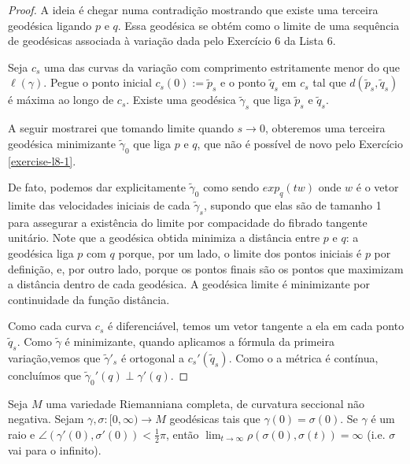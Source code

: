 \begin{proof}
A ideia é chegar numa contradição mostrando que existe uma terceira geodésica
ligando $p$ e $q$. Essa geodésica se obtém como o limite de uma sequência de
geodésicas associada à variação dada pelo Exercício 6 da Lista 6.

Seja $c_s$ uma das curvas da variação com comprimento estritamente
menor do que $\ell(\gamma)$. Pegue o ponto inicial $c_s(0):=\tilde{p}_s$ e o 
ponto $\tilde{q}_s$ em $c_s$ tal que $d(\tilde{p}_s,\tilde{q}_s)$ é máxima ao 
longo de $c_s$. Existe uma geodésica $\tilde{\gamma}_s$ que liga 
$\tilde{p}_s$ e $\tilde{q}_s$.

A seguir mostrarei que tomando limite quando $s \to 0$, obteremos uma terceira
geodésica minimizante $\tilde{\gamma}_0$ que liga $p$ e $q$, que não é possível
de novo pelo Exercício \ref{exercise-l8-1}.

De fato, podemos dar explicitamente $\tilde{\gamma}_0$ como sendo $exp_q(tw)$
onde $w$ é o vetor limite das velocidades iniciais de cada $\tilde{\gamma}_s$,
supondo que elas são de tamanho 1 para assegurar a existência do limite por
compacidade do fibrado tangente unitário. Note que a geodésica obtida minimiza a
distância entre $p$ e $q$: a geodésica liga $p$ com  $q$ porque, por um lado, o
limite dos pontos iniciais é $p$ por definição, e, por outro lado, porque os
pontos finais são os pontos que maximizam a distância dentro de cada geodésica.
A geodésica limite é minimizante por continuidade da função distância.

Como cada curva $c_s$ é diferenciável, temos um vetor tangente a ela em cada
ponto $\tilde{q}_s$. Como $\tilde{\gamma}$ é minimizante, quando aplicamos a
fórmula da primeira variação,vemos que $\tilde{\gamma}'_s$ é ortogonal a
$c_s'(\tilde{q}_s)$. Como o a métrica é contínua, concluímos que
$\tilde{\gamma}_0'(q) \perp \gamma'(q)$.
\end{proof}

\begin{exercise}
\label{exercise-l8-11}
Seja $M$ uma variedade Riemanniana completa, de curvatura seccional não
negativa. Sejam $\gamma,\sigma:[0,\infty) \to M$ geodésicas tais que
$\gamma(0)=\sigma(0)$. Se $\gamma$ é um raio e
$\angle(\gamma'(0),\sigma'(0))<\frac{1}{2}\pi$, então $\lim_{t \to \infty}
\rho(\sigma(0),\sigma(t))=\infty$ (i.e. $\sigma$ vai para o infinito).
\end{exercise}

